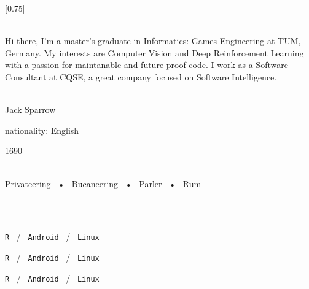 \documentclass[lighthipster]{simplehipstercv}
\begin{document}
\setlength{\columnsep}{1.5cm}
[0.75]
\begin{paracol}{2}

    \paracolbackgroundoptions



    \footnotesize
    {\setasidefontcolour
    \flushright
    \begin{center}
    \end{center}

    \\[0.5em]

    {\footnotesize
    Hi there, I'm a master's graduate in Informatics: Games Engineering at TUM, Germany. My interests are Computer Vision and Deep Reinforcement Learning with a passion for maintanable and future-proof code. I work as a Software Consultant at CQSE, a great company focused on Software Intelligence.
    }
    \bigskip

     \\[0.5em]
    Jack Sparrow

    nationality: English

    1690

    \bigskip

     \\[0.5em]

    Privateering ~•~ Bucaneering ~•~ Parler ~•~ Rum

    \bigskip



    \bigskip

    \\[0.5em]

    \lorem
    \bigskip

    \\[0.5em]

    \texttt{R} ~/~ \texttt{Android} ~/~ \texttt{Linux}

    \texttt{R} ~/~ \texttt{Android} ~/~ \texttt{Linux}

    \texttt{R} ~/~ \texttt{Android} ~/~ \texttt{Linux}

    \vspace{4em}

}
\end{paracol}
\end{document}
